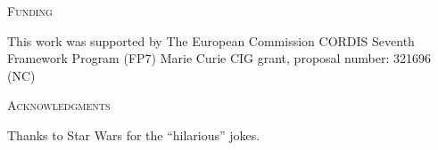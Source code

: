 \documentclass[a4paper,12pt]{article}
\renewcommand{\section}[1]{%
\bigskip
\begin{center}
\begin{Large}
\normalfont\scshape #1
\medskip
\end{Large}
\end{center}}
\begin{document}












\section{Funding}
This work was supported by The European Commission CORDIS Seventh Framework Program (FP7) Marie Curie CIG grant, proposal number: 321696 (NC)

\section{Acknowledgments}
Thanks to Star Wars for the ``hilarious'' jokes.



\end{document}
